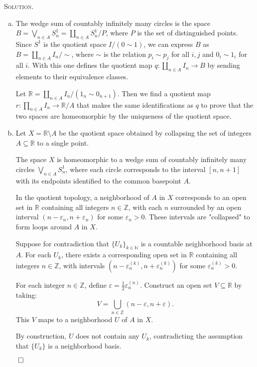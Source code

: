 \documentclass[12pt, a4paper, oneside]{ctexart}
\newenvironment{solution}{%
	\par\noindent\textsc{Solution. }\ignorespaces
}{%
	\hfill$\qed$\par
}
\begin{document}
	\begin{solution}
			
		\begin{enumerate}[(a)]
			\item The wedge sum of countably infinitely many circles is the space
			\( B = \bigvee_{n\in A} S^1_n = \coprod_{n\in A} S^1_n / P \), 
			where $P$ is the set of distinguished points.
			Since \( S^1 \) is the quotient space 
			\( I / (0 \sim 1) \), we can express \( B \) as \( B = \coprod_{n\in A} I_n / \sim \), 
			where \( \sim \) is the relation \( p_i \sim p_j \) for all \( i, j \) and \( 0_i \sim 1_i \) 
			for all \( i \). With this one defines the quotient map \( q : \coprod_{n\in A} I_n \to B \) 
			by sending elements to their equivalence classes.

			Let \( \mathbb{R} = \coprod_{n\in A} I_n / (1_n \sim 0_{n+1}) \). 
			Then we find a quotient map \( r : \prod_{n\in A} I_n \to \mathbb{R} / A \) 
			that makes the same identifications as \( q \) to prove that the two spaces are 
			homeomorphic by the uniqueness of the quotient space.

			\item Let $X = \mathbb{R}\setminus A$ be the quotient space obtained by 
			collapsing the set of integers $A\subseteq\mathbb{R}$ to a single point. 
			
			The space $X$ is homeomorphic to a wedge sum of countably infinitely many circles 
			$\bigvee_{n\in A} S^1_n$, where each circle corresponds to the interval 
			$[n,n+1]$ with its endpoints identified to the common basepoint $A$.

			In the quotient topology, a neighborhood of \( A \) in \( X \) 
			corresponds to an open set in \( \mathbb{R} \) containing all integers 
			\( n \in \mathbb{Z} \), with each \( n \) surrounded by an open interval 
			\( (n - \varepsilon_n, n + \varepsilon_n) \) for some \( \varepsilon_n > 0 \). 
			These intervals are "collapsed" to form loops around \( A \) in \( X \).
			
			Suppose for contradiction that \( \{U_k\}_{k \in \mathbb{N}} \) is a countable neighborhood basis at \( A \).
			For each \( U_k \), there exists a corresponding open set in \( \mathbb{R} \) containing all integers 
			\( n \in \mathbb{Z} \), with intervals \( \left(n - \varepsilon_n^{(k)}, n + \varepsilon_n^{(k)}\right) \) 
			for some \( \varepsilon_n^{(k)} > 0 \).

			For each integer \( n \in \mathbb{Z} \), define \( \varepsilon = \frac{1}{2} \varepsilon_n^{(n)} \). 
			Construct an open set \( V \subseteq \mathbb{R} \) by taking:
			\[
			V = \bigcup_{n \in \mathbb{Z}} (n - \varepsilon, n + \varepsilon) .
			\]
			This \( V \) maps to a neighborhood \( U \) of \( A \) in \( X \).

			By construction, \( U \) does not contain any \( U_k \), contradicting the assumption that \( \{U_k\} \) is a neighborhood basis.

		\end{enumerate}

	\end{solution}
	
\end{document}
